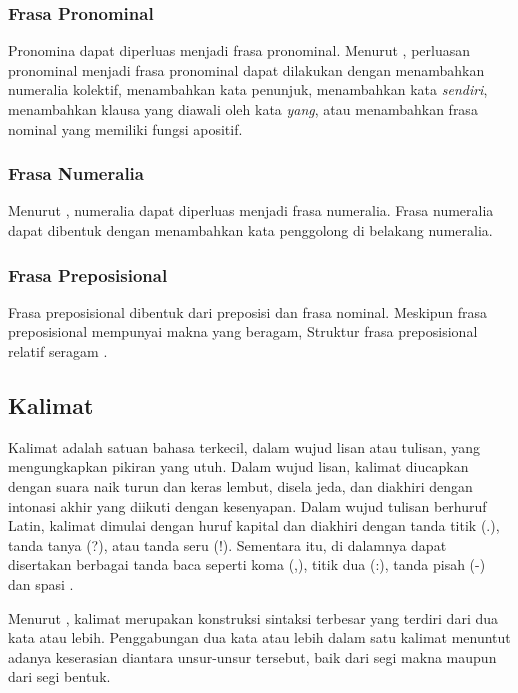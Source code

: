 \subsubsection{Frasa Pronominal}
Pronomina dapat diperluas menjadi frasa pronominal. Menurut \citet{alwi}, perluasan pronominal menjadi frasa pronominal dapat dilakukan dengan menambahkan numeralia kolektif, menambahkan kata penunjuk, menambahkan kata \emph{sendiri}, menambahkan klausa yang diawali oleh kata \emph{yang}, atau menambahkan frasa nominal yang memiliki fungsi apositif.

\subsubsection{Frasa Numeralia}
Menurut \citet{alwi}, numeralia dapat diperluas menjadi frasa numeralia. Frasa numeralia dapat dibentuk dengan menambahkan kata penggolong di belakang numeralia.

\subsubsection{Frasa Preposisional}
Frasa preposisional dibentuk dari preposisi dan frasa nominal. Meskipun frasa preposisional mempunyai makna yang beragam, Struktur frasa preposisional relatif seragam \citep{lapoliwa}.

\subsection{Kalimat}
Kalimat adalah satuan bahasa terkecil, dalam wujud lisan atau tulisan, yang mengungkapkan pikiran yang utuh. Dalam wujud lisan, kalimat diucapkan dengan suara naik turun dan keras lembut, disela jeda, dan diakhiri dengan intonasi akhir yang diikuti dengan kesenyapan. Dalam wujud tulisan berhuruf Latin, kalimat dimulai dengan huruf kapital dan diakhiri dengan tanda titik (.), tanda tanya (?), atau tanda seru (!). Sementara itu, di dalamnya dapat disertakan berbagai tanda baca seperti koma (,), titik dua (:), tanda pisah (-) dan spasi \citep{alwi}.

Menurut \citet{alwi}, kalimat merupakan konstruksi sintaksi terbesar yang terdiri dari dua kata atau lebih. Penggabungan dua kata atau lebih dalam satu kalimat menuntut adanya keserasian diantara unsur-unsur tersebut, baik dari segi makna maupun dari segi bentuk.

